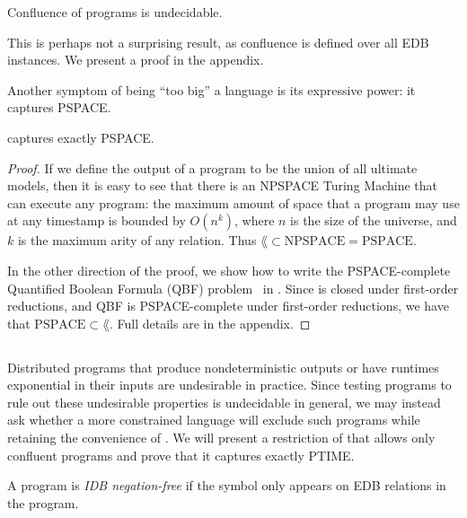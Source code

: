 \begin{lemma}
\label{lem:confluence-undecidable}
Confluence of \lang programs is undecidable.
\end{lemma}
This is perhaps not a surprising result, as confluence is defined over all EDB instances.  We present a proof in the appendix.


Another symptom of \lang being ``too big'' a language is its expressive power: it captures PSPACE.  

\begin{lemma}
\label{lem:lang-pspace}
\lang captures exactly PSPACE.
\end{lemma}

\begin{proof}
If we define the output of a \lang program to be the union of all ultimate models, then it is easy to see that there is an NPSPACE Turing Machine that can execute any \lang program: the maximum amount of space that a \lang program may use at any timestamp is bounded by $O(n^k)$, where $n$ is the size of the universe, and $k$ is the maximum arity of any relation.  Thus $\lang \subset \text{NPSPACE} = \text{PSPACE}$.

In the other direction of the proof, we show how to write the PSPACE-complete Quantified Boolean Formula (QBF) problem~\cite{garey-johnson} in \lang. Since \lang is closed under first-order reductions, and QBF is PSPACE-complete under first-order reductions, we have that $\text{PSPACE} \subset \lang$.  Full details are in the appendix.
\end{proof}

\subsection{\large \bf \slang}

Distributed programs that produce nondeterministic outputs or have runtimes
exponential in their inputs are undesirable in practice.  Since testing \lang
programs to rule out these undesirable properties is undecidable in general, we
may instead ask whether a more constrained language will exclude such programs
while retaining the convenience of \lang.  We will present a restriction of
\lang that allows only confluent programs and prove that it captures exactly
PTIME.

\begin{definition}
A \lang program is {\em IDB negation-free} if the \dedalus{!} symbol only appears on EDB relations in the program.
\end{definition}

